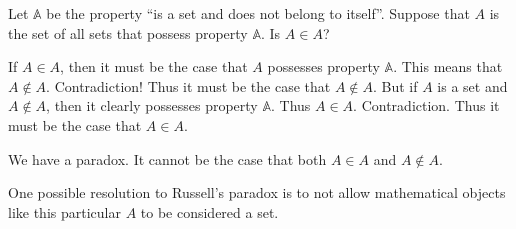 \documentclass[letterpaper,10pt,english]{jupyterBook}
\begin{document}
\sphinxAtStartPar
Let \(\mathbb{A}\) be the property “is a set and does not belong to itself”. Suppose that \(A\) is the set of all sets that possess property \(\mathbb{A}\). Is \(A \in A\)?

\sphinxAtStartPar
If \(A \in A\), then it must be the case that \(A\) possesses property \(\mathbb{A}\). This means that \(A \notin A\). Contradiction! Thus it must be the case that \(A \notin A\). But if \(A\) is a set and \(A \notin A\), then it clearly possesses property \(\mathbb{A}\). Thus \(A \in A\). Contradiction. Thus it must be the case that \(A \in A\).

\sphinxAtStartPar
We have a paradox. It cannot be the case that both \(A \in A\) and \(A \notin A\).

\sphinxAtStartPar
One possible resolution to Russell’s paradox is to not allow mathematical objects like this particular \(A\) to be considered a set.
\end{document}
